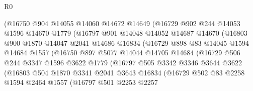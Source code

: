 \begin{lexlean}{R0}
\begin{coremodule}
                    (@16750
                      @904
                      @14055
                      @14060
                      @14672
                      @14649
                      (@16729
                        @902
                        @244
                        @14053
                        @1596
                        @14670
                        @1779
                        (@16797
                          @901
                          @14048
                          @14052
                          @14687
                          @14670
                          (@16803
                            @900
                            @1870
                            @14047
                            @2041
                            @14686
                            @16834
                            (@16729
                              @898
                              @83
                              @14045
                              @1594
                              @14684
                              @1557
                              (@16750
                                @897
                                @5077
                                @14044
                                @14705
                                @14684
                                (@16729
                                  @506
                                  @244
                                  @3347
                                  @1596
                                  @3622
                                  @1779
                                  (@16797
                                    @505
                                    @3342
                                    @3346
                                    @3644
                                    @3622
                                    (@16803
                                      @504
                                      @1870
                                      @3341
                                      @2041
                                      @3643
                                      @16834
                                      (@16729
                                        @502
                                        @83
                                        @2258
                                        @1594
                                        @2464
                                        @1557
                                        (@16797
                                          @501
                                          @2253
                                          @2257

\end{coremodule}
\end{lexlean}
